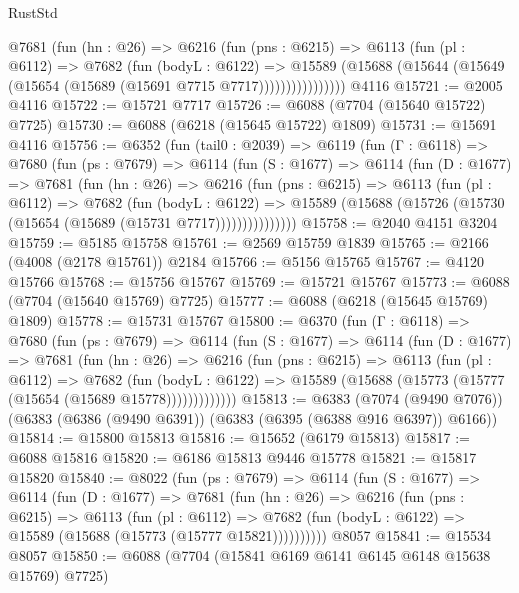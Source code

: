 \begin{lexlean}{RustStd}
\begin{coremodule}
              @7681
                (fun (hn : @26) =>
                @6216
                  (fun (pns : @6215) =>
                  @6113
                    (fun (pl : @6112) =>
                    @7682
                      (fun (bodyL : @6122) =>
                      @15589
                        (@15688 (@15644 (@15649 (@15654 (@15689 (@15691 @7715 @7717))))))))))))))))
    @4116
@15721 := @2005 @4116
@15722 := @15721 @7717
@15726 := @6088 (@7704 (@15640 @15722) @7725)
@15730 := @6088 (@6218 (@15645 @15722) @1809)
@15731 := @15691 @4116
@15756 := @6352
    (fun (tail0 : @2039) =>
    @6119
      (fun (Γ : @6118) =>
      @7680
        (fun (ps : @7679) =>
        @6114
          (fun (S : @1677) =>
          @6114
            (fun (D : @1677) =>
            @7681
              (fun (hn : @26) =>
              @6216
                (fun (pns : @6215) =>
                @6113
                  (fun (pl : @6112) =>
                  @7682
                    (fun (bodyL : @6122) =>
                    @15589 (@15688 (@15726 (@15730 (@15654 (@15689 (@15731 @7717)))))))))))))))
@15758 := @2040 @4151 @3204
@15759 := @5185 @15758
@15761 := @2569 @15759 @1839
@15765 := @2166 (@4008 (@2178 @15761)) @2184
@15766 := @5156 @15765
@15767 := @4120 @15766
@15768 := @15756 @15767
@15769 := @15721 @15767
@15773 := @6088 (@7704 (@15640 @15769) @7725)
@15777 := @6088 (@6218 (@15645 @15769) @1809)
@15778 := @15731 @15767
@15800 := @6370
    (fun (Γ : @6118) =>
    @7680
      (fun (ps : @7679) =>
      @6114
        (fun (S : @1677) =>
        @6114
          (fun (D : @1677) =>
          @7681
            (fun (hn : @26) =>
            @6216
              (fun (pns : @6215) =>
              @6113
                (fun (pl : @6112) =>
                @7682
                  (fun (bodyL : @6122) =>
                  @15589 (@15688 (@15773 (@15777 (@15654 (@15689 @15778)))))))))))))
@15813 := @6383
    (@7074 (@9490 @7076))
    (@6383 (@6386 (@9490 @6391)) (@6383 (@6395 (@6388 @916 @6397)) @6166))
@15814 := @15800 @15813
@15816 := @15652 (@6179 @15813)
@15817 := @6088 @15816
@15820 := @6186 @15813 @9446 @15778
@15821 := @15817 @15820
@15840 := @8022
    (fun (ps : @7679) =>
    @6114
      (fun (S : @1677) =>
      @6114
        (fun (D : @1677) =>
        @7681
          (fun (hn : @26) =>
          @6216
            (fun (pns : @6215) =>
            @6113
              (fun (pl : @6112) =>
              @7682 (fun (bodyL : @6122) => @15589 (@15688 (@15773 (@15777 @15821))))))))))
    @8057
@15841 := @15534 @8057
@15850 := @6088 (@7704 (@15841 @6169 @6141 @6145 @6148 @15638 @15769) @7725)

\end{coremodule}
\end{lexlean}
